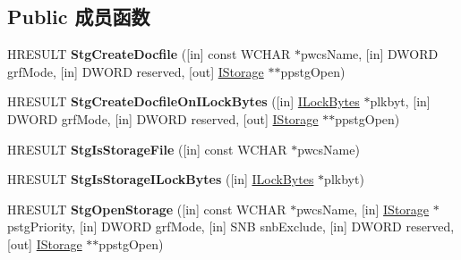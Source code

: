 \subsection*{Public 成员函数}
\begin{DoxyCompactItemize}
\item 
\mbox{\label{interface_i_i_t_storage_a94b6923d1fab3af92f343a335c1490a9}} 
H\+R\+E\+S\+U\+LT {\bfseries Stg\+Create\+Docfile} (\mbox{[}in\mbox{]} const W\+C\+H\+AR $\ast$pwcs\+Name, \mbox{[}in\mbox{]} D\+W\+O\+RD grf\+Mode, \mbox{[}in\mbox{]} D\+W\+O\+RD reserved, \mbox{[}out\mbox{]} \hyperlink{interface_i_storage}{I\+Storage} $\ast$$\ast$ppstg\+Open)
\item 
\mbox{\label{interface_i_i_t_storage_a8f3ea0e7c8c202255b7eb8bfa1ebd00a}} 
H\+R\+E\+S\+U\+LT {\bfseries Stg\+Create\+Docfile\+On\+I\+Lock\+Bytes} (\mbox{[}in\mbox{]} \hyperlink{interface_i_lock_bytes}{I\+Lock\+Bytes} $\ast$plkbyt, \mbox{[}in\mbox{]} D\+W\+O\+RD grf\+Mode, \mbox{[}in\mbox{]} D\+W\+O\+RD reserved, \mbox{[}out\mbox{]} \hyperlink{interface_i_storage}{I\+Storage} $\ast$$\ast$ppstg\+Open)
\item 
\mbox{\label{interface_i_i_t_storage_a6e87eae254ecaab57038565b37f841d5}} 
H\+R\+E\+S\+U\+LT {\bfseries Stg\+Is\+Storage\+File} (\mbox{[}in\mbox{]} const W\+C\+H\+AR $\ast$pwcs\+Name)
\item 
\mbox{\label{interface_i_i_t_storage_a32dbcf2c2084c03b55934960d5cd1d55}} 
H\+R\+E\+S\+U\+LT {\bfseries Stg\+Is\+Storage\+I\+Lock\+Bytes} (\mbox{[}in\mbox{]} \hyperlink{interface_i_lock_bytes}{I\+Lock\+Bytes} $\ast$plkbyt)
\item 
\mbox{\label{interface_i_i_t_storage_ad5acf532f127e505c2c9cf6a46069038}} 
H\+R\+E\+S\+U\+LT {\bfseries Stg\+Open\+Storage} (\mbox{[}in\mbox{]} const W\+C\+H\+AR $\ast$pwcs\+Name, \mbox{[}in\mbox{]} \hyperlink{interface_i_storage}{I\+Storage} $\ast$pstg\+Priority, \mbox{[}in\mbox{]} D\+W\+O\+RD grf\+Mode, \mbox{[}in\mbox{]} S\+NB snb\+Exclude, \mbox{[}in\mbox{]} D\+W\+O\+RD reserved, \mbox{[}out\mbox{]} \hyperlink{interface_i_storage}{I\+Storage} $\ast$$\ast$ppstg\+Open)
\item 
\mbox{\label{interface_i_i_t_storage_ad1bce3d7d62169e0297dcbd06ac7507e}} 
$$
\end{DoxyCompactItemize}
